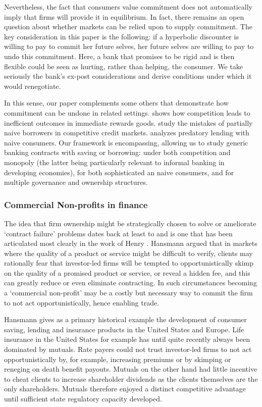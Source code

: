 \documentclass[11pt,english]{article}
\theoremstyle{plain}
\theoremstyle{definition}
\begin{document}
Nevertheless, the fact that consumers value commitment does not automatically
imply that firms will provide it in equilibrium. In fact, there remains
an open question about whether markets can be relied upon to supply
commitment. The key consideration in this paper is the following:
if a hyperbolic discounter is willing to pay to commit her future
selves, her future selves are willing to pay to undo this commitment.
Here, a bank that promises to be rigid and is then flexible could
be seen as hurting, rather than helping, the consumer. We take seriously
the bank's ex-post considerations and derive conditions under which
it would renegotiate.

In this sense, our paper complements some others that demonstrate
how commitment can be undone in related settings. \citet{gottlieb2008}
shows how competition leads to inefficient outcomes in immediate rewards
goods. \citet{heidhues2010} study the mistakes of partially
naive borrowers in competitive credit markets. \citet{mendez2012}
analyzes predatory lending with naive consumers. Our framework is
encompassing, allowing us to study generic banking contracts with
saving or borrowing: under both competition and monopoly (the latter
being particularly relevant to informal banking in developing economies),
for both sophisticated an naive consumers, and for multiple governance
and ownership structures.

\subsubsection{Commercial Non-profits in finance}

The idea that firm ownership might be strategically chosen to solve
or ameliorate `contract failure' problems dates back at least to \citet{arrow1963}
and is one that has been articulated most clearly in the work of Henry
\citet{hansmann1996}. Hansmann argued that in markets
where the quality of a product or service might be difficult to verify,
clients may rationally fear that investor-led firms will be tempted
to opportunistically skimp on the quality of a promised product or
service, or reveal a hidden fee, and this can greatly reduce or even
eliminate contracting. In such circumstances becoming a `commercial
non-profit' may be a costly but necessary way to commit the firm to
not act opportunistically, hence enabling trade.

Hansmann gives as a primary historical example the development of
consumer saving, lending and insurance products in the United States
and Europe. Life insurance in the United States for example has until
quite recently always been dominated by mutuals. Rate payers could
not trust investor-led firms to not act opportunistically by, for
example, increasing premiums or by skimping or reneging on death benefit
payouts. Mutuals on the other hand had little incentive to cheat clients
to increase shareholder dividends as the clients themselves are the
only shareholders. Mutuals therefore enjoyed a distinct competitive
advantage until sufficient state regulatory capacity developed.
\end{document}

